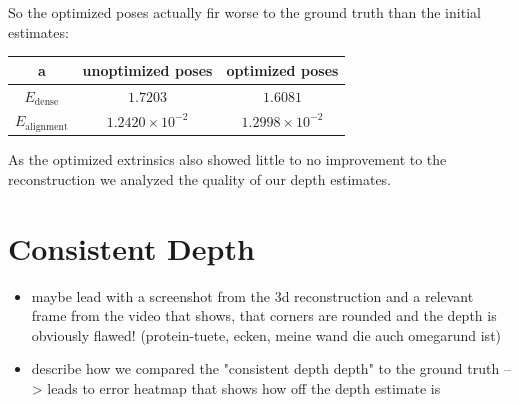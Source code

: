         So the optimized poses actually fir worse to the ground truth than the initial estimates:
        \begin{center}
            \begin{tabular}[]{c | c | c}
                a & unoptimized poses & optimized poses\\
                \hline
                $E_{\text{dense}}$ & $1.7203$ & $1.6081$\\
                \hline
                $E_{\text{alignment}}$ & $1.2420\times10^{-2}$ & $1.2998\times10^{-2}$
            \end{tabular}
        \end{center}
        As the optimized extrinsics also showed little to no improvement to the reconstruction we analyzed the quality of our depth estimates.
    \section{Consistent Depth}
        \begin{itemize}
            \item maybe lead with a screenshot from the 3d reconstruction and a relevant frame from the video that shows, that corners are rounded and the depth is obviously flawed! (protein-tuete, ecken, meine wand die auch omegarund ist)
            \item describe how we compared the "consistent depth depth" to the ground truth --> leads to error heatmap that shows how off the depth estimate is
        \end{itemize}